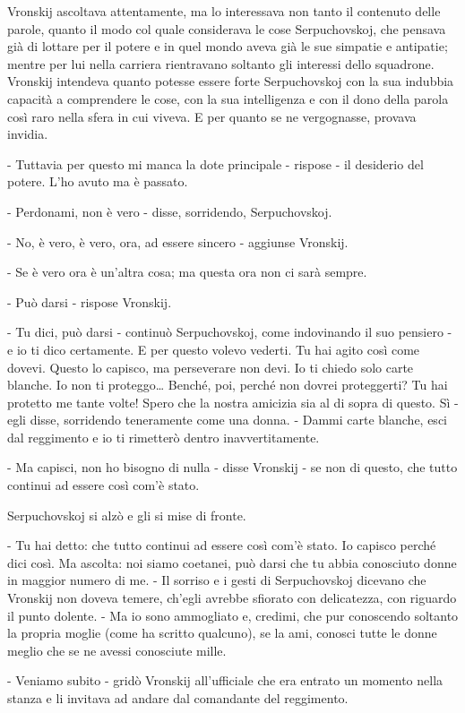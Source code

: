 Vronskij ascoltava attentamente, ma lo interessava non tanto il contenuto delle parole, quanto il modo col quale considerava le cose Serpuchovskoj, che pensava già di lottare per il potere e in quel mondo aveva già le sue simpatie e antipatie; mentre per lui nella carriera rientravano soltanto gli interessi dello squadrone. Vronskij intendeva quanto potesse essere forte Serpuchovskoj con la sua indubbia capacità a comprendere le cose, con la sua intelligenza e con il dono della parola così raro nella sfera in cui viveva. E per quanto se ne vergognasse, provava invidia. 

- Tuttavia per questo mi manca la dote principale - rispose - il desiderio del potere. L'ho avuto ma è passato. 

- Perdonami, non è vero - disse, sorridendo, Serpuchovskoj. 

- No, è vero, è vero, ora, ad essere sincero - aggiunse Vronskij. 

- Se è vero ora è un'altra cosa; ma questa ora non ci sarà sempre. 

- Può darsi - rispose Vronskij. 

- Tu dici, può darsi - continuò Serpuchovskoj, come indovinando il suo pensiero - e io ti dico certamente. E per questo volevo vederti. Tu hai agito così come dovevi. Questo lo capisco, ma perseverare non devi. Io ti chiedo solo carte blanche. Io non ti proteggo\ldots{} Benché, poi, perché non dovrei proteggerti? Tu hai protetto me tante volte! Spero che la nostra amicizia sia al di sopra di questo. Sì - egli disse, sorridendo teneramente come una donna. - Dammi carte blanche, esci dal reggimento e io ti rimetterò dentro inavvertitamente. 

- Ma capisci, non ho bisogno di nulla - disse Vronskij - se non di questo, che tutto continui ad essere così com'è stato. 

Serpuchovskoj si alzò e gli si mise di fronte. 

- Tu hai detto: che tutto continui ad essere così com'è stato. Io capisco perché dici così. Ma ascolta: noi siamo coetanei, può darsi che tu abbia conosciuto donne in maggior numero di me. - Il sorriso e i gesti di Serpuchovskoj dicevano che Vronskij non doveva temere, ch'egli avrebbe sfiorato con delicatezza, con riguardo il punto dolente. - Ma io sono ammogliato e, credimi, che pur conoscendo soltanto la propria moglie (come ha scritto qualcuno), se la ami, conosci tutte le donne meglio che se ne avessi conosciute mille. 

- Veniamo subito - gridò Vronskij all'ufficiale che era entrato un momento nella stanza e li invitava ad andare dal comandante del reggimento. 

